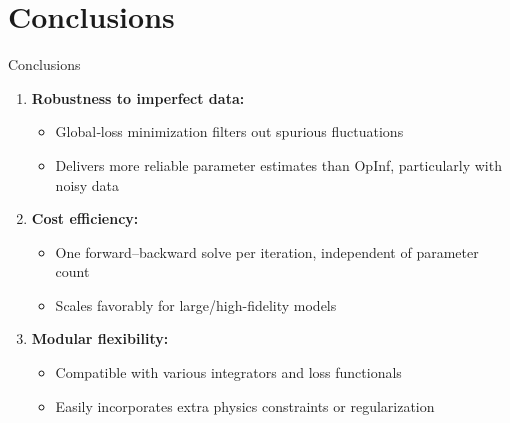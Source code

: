 \section{Conclusions}

\begin{frame}{Conclusions}

\begin{enumerate}
  \item \textbf{Robustness to imperfect data:}  
    \begin{itemize}
        \item Global‐loss minimization filters out spurious fluctuations
        \item Delivers more reliable parameter estimates than OpInf, particularly with noisy data
    \end{itemize}
    \vspace{0.6cm}
  \item \textbf{Cost efficiency:}  
    \begin{itemize}
        \item One forward–backward solve per iteration, independent of parameter count
        \item Scales favorably for large/high-fidelity models
    \end{itemize}
  \vspace{0.6cm}
  \item \textbf{Modular flexibility:}  
    \begin{itemize}
        \item Compatible with various integrators and loss functionals
        \item Easily incorporates extra physics constraints or regularization
    \end{itemize}
\end{enumerate}

\end{frame}


